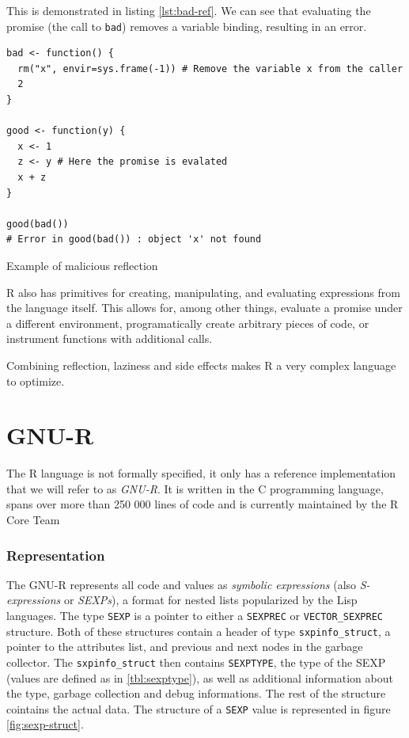 This is demonstrated in listing \ref{lst:bad-ref}. We can see that evaluating the promise (the call to \texttt{bad}) removes a variable binding, resulting in an error.

\begin{listing}
	\centering
	\begin{verbatim}
bad <- function() {
  rm("x", envir=sys.frame(-1)) # Remove the variable x from the caller
  2
}

good <- function(y) {
  x <- 1
  z <- y # Here the promise is evalated
  x + z
}

good(bad())
# Error in good(bad()) : object 'x' not found
  \end{verbatim}
	\caption{Example of malicious reflection\cite{r-melts-brains}}\label{lst:bad-ref}
\end{listing}

R also has primitives for creating, manipulating, and evaluating expressions from the language itself. This allows for, among other things, evaluate a promise under a different environment, programatically create arbitrary pieces of code, or instrument functions with additional calls.

Combining reflection, laziness and side effects makes R a very complex language to optimize.

\newpage
\section{GNU-R}

The R language is not formally specified, it only has a reference implementation that we will refer to as \textit{GNU-R}. It is written in the C programming language, spans over more than {250 000} lines of code and is currently maintained by the R Core Team

\subsubsection*{Representation}

The GNU-R represents all code and values as \textit{symbolic expressions} (also \textit{S-expressions} or \textit{SEXPs}), a format for nested lists popularized by the Lisp languages. The type \texttt{SEXP} is a pointer to either a \texttt{SEXPREC} or \texttt{VECTOR\_SEXPREC} structure. Both of these structures contain a header of type \texttt{sxpinfo\_struct}, a pointer to the attributes list, and previous and next nodes in the garbage collector. The \texttt{sxpinfo\_struct} then contains \texttt{SEXPTYPE}, the type of the SEXP (values are defined as in \ref{tbl:sexptype}), as well as additional information about the type, garbage collection and debug informations. The rest of the structure cointains the actual data. The structure of a \texttt{SEXP} value is represented in figure \ref{fig:sexp-struct}.

